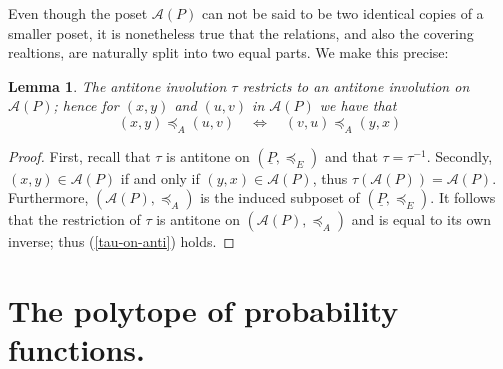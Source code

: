 \documentclass[11pt,a4paper,abstract=yes]{scrartcl}
\theoremstyle{plain}
\newtheorem{lemma}[theorem]{Lemma}
\newcommand{\transerel}{\preceq_{E}}
\newcommand{\twoanti}[1]{\mathcal{A}({#1})}
\newcommand{\transterel}{\preceq_{A}}
\newcommand{\Pairs}[1]{\underline{#1}}
\newcommand{\Ppairs}{\Pairs{P}}
\begin{document}
Even though the poset \(\twoanti{P}\) can not be said to be two identical copies of a smaller poset,
it is nonetheless true that the relations, and also the covering realtions, are naturally split
into two equal parts. We make this precise:
\begin{lemma}
The antitone involution \(\tau\) restricts to an antitone involution on \(\twoanti{P}\);
hence for  \((x,y)\) and \((u,v)\) in \(\twoanti{P}\) we have that
\begin{equation}
\label{tau-on-anti}
(x,y) \transterel (u,v) \quad \iff \quad (v,u) \transterel (y,x)
\end{equation}
\end{lemma}
\begin{proof}
First, recall that \(\tau\) is antitone on \((\Ppairs,\transerel)\) and that
\(\tau = \tau^{-1}\). Secondly, \((x,y) \in \twoanti{P}\) if and only if \((y,x) \in \twoanti{P}\), thus
\(\tau(\twoanti{P}) = \twoanti{P}\). Furthermore, \((\twoanti{P},\transterel)\) is the induced subposet
of \((\Ppairs,\transerel)\). It follows that the restriction of \(\tau\) is antitone on
\((\twoanti{P},\transterel)\) and is equal to its own inverse; thus (\ref{tau-on-anti}) holds.
\end{proof}
\section{The polytope of probability functions.}
\label{sec:org9cf55fd}
\end{document}
